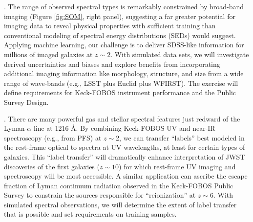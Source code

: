 \documentclass[oneside,11pt]{amsart}
\newcounter{chalno}
\newcommand{\chal}[1]{\refstepcounter{chalno}\label{#1}}
\begin{document}
\medskip
\chal{phot}
.  The range of observed spectral types is remarkably constrained by broad-band imaging (Figure \ref{fig:SOM}, right panel), suggesting a far greater potential for imaging data to reveal physical properties with sufficient training than conventional modeling of spectral energy distributions (SEDs) would suggest.  Applying machine learning, our challenge is to deliver SDSS-like information for millions of imaged galaxies at $z \sim 2$.  With simulated data sets, we will investigate derived uncertainties and biases and explore benefits from incorporating additional imaging information like morphology, structure, and size from a wide range of wave-bands (e.g., LSST plus Euclid plus WFIRST).  The exercise will define requirements for Keck-FOBOS instrument performance and the Public Survey Design.

\medskip
\chal{uv}
.  There are many powerful gas and stellar spectral features just redward of the Lyman-$\alpha$ line at 1216
\AA.  By combining Keck-FOBOS UV and near-IR spectroscopy (e.g., from PFS) at $z \sim 2$, we can transfer ``labels''
best modeled in the rest-frame optical to spectra at UV wavelengths, at least for certain types of galaxies.  This
``label transfer'' will dramatically enhance interpretation of JWST discoveries of the first galaxies ($z \sim 10$) for
which rest-frame UV imaging and spectroscopy will be most accessible.  A similar application can ascribe the escape
fraction of Lyman continuum radiation observed in the Keck-FOBOS Public Survey to constrain the sources responsible for
``reionization'' at $z \sim 6$.  With simulated spectral observations, we will determine the extent of label transfer
that is possible and set requirements on training samples.
\end{document}
